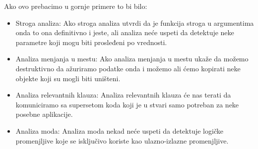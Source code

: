 Ako ovo prebacimo u gornje primere to bi bilo:

\begin{itemize}
\item Stroga analiza:
Ako stroga analiza utvrdi da je funkcija stroga u argumentima onda to ona definitivno i jeste, ali analiza neće uspeti da detektuje neke parametre koji mogu biti prosleđeni po vrednosti. 

\item Analiza menjanja u mestu:
Ako analiza menjanja u mestu ukaže da možemo destruktivno da ažuriramo podatke onda i možemo ali ćemo kopirati neke objekte koji su mogli biti uništeni. \cite{Girard1987}

\item Analiza relevantnih klauza:
Analiza relevantnih klauza će nas terati da komuniciramo sa supersetom koda koji je u stvari samo potreban za neke posebne aplikacije.  

\item Analiza moda:
Analiza moda nekad neće uspeti da detektuje logičke promenjljive koje se isključivo koriste kao ulazno-izlazne promenjljive. 

\end{itemize}
